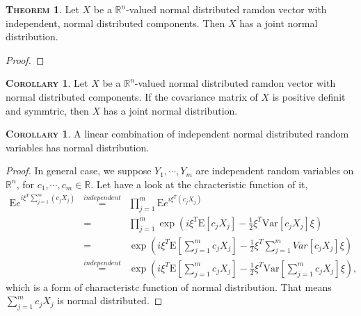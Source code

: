 \documentclass[a4paper, twoside, 11pt]{article}
\theoremstyle{definition}
\newtheorem{theorem}[definition]{\scshape Theorem}
\newtheorem{corollary}[definition]{\scshape Corollary}
\newcommand{\brkt}[1]{\left({#1} \right)}
\begin{document}
\begin{theorem}
  Let $X$ be a $\mathbb{R}^{n}$-valued normal distributed ramdon vector with independent, normal distributed components. Then $X$ has a joint normal distribution.
\end{theorem}

\begin{proof}
  
\end{proof}

\begin{corollary}
  Let $X$ be a $\mathbb{R}^{n}$-valued normal distributed ramdon vector with normal distributed components. If the covariance matrix of $X$ is positive definit and symmtric, then $X$ has a joint normal distribution.
  \label{sec:mulnor}
\end{corollary}

\begin{corollary}
  A linear combination of independent normal distributed random variables has normal distribution.
\end{corollary}

\begin{proof}
  In general case, we suppose $Y_1, \cdots, Y_m$ are independent random variables on $\mathbb{R}^n$, for $c_1, \cdots, c_m \in \mathbb{R}$. Let have a look at the chracteristic function of it,
  \begin{eqnarray*}
	\mathrm{E}e^{i\xi^T\sum_{j=1}^m(c_jX_j)} &\overset{independent}{=}&\prod_{j=1}^{m} \mathrm{E}e^{i\xi^T(c_jX_j)}\\
	&=& \prod_{j=1}^m \exp\brkt{i\xi^T\mathrm{E}[c_jX_j]-\frac{1}{2}\xi^T\mathrm{Var}[c_jX_j]\xi}\\
	&=&  \exp\brkt{i\xi^T\mathrm{E}[\sum_{j=1}^{m}c_jX_j]-\frac{1}{2}\xi^T\mathrm\sum_{j=1}^{m}{Var}[c_jX_j]\xi}\\
	&\overset{independent}{=}&  \exp\brkt{i\xi^T\mathrm{E}[\sum_{j=1}^{m}c_jX_j]-\frac{1}{2}\xi^T\mathrm{Var}[\sum_{j=1}^{m}c_jX_j]\xi},
  \end{eqnarray*}
  which is a form of characteristc function of normal distribution. That means $\sum_{j=1}^m c_jX_j$ is normal distributed. 
\end{proof}
\end{document}
